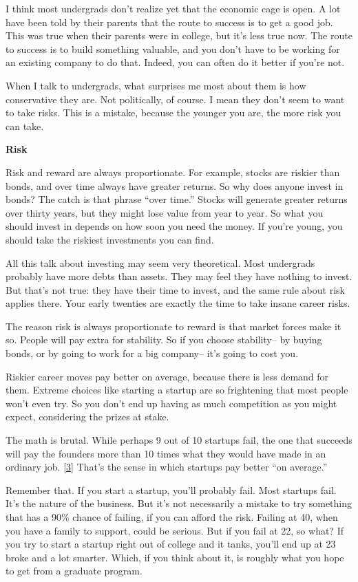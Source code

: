 I think most undergrads don't realize yet that the economic cage is
open. A lot have been told by their parents that the route to success is
to get a good job. This was true when their parents were in college, but
it's less true now. The route to success is to build something valuable,
and you don't have to be working for an existing company to do that.
Indeed, you can often do it better if you're not.

When I talk to undergrads, what surprises me most about them is how
conservative they are. Not politically, of course. I mean they don't
seem to want to take risks. This is a mistake, because the younger you
are, the more risk you can take.

\textbf{Risk}

Risk and reward are always proportionate. For example, stocks are
riskier than bonds, and over time always have greater returns. So why
does anyone invest in bonds? The catch is that phrase ``over time.''
Stocks will generate greater returns over thirty years, but they might
lose value from year to year. So what you should invest in depends on
how soon you need the money. If you're young, you should take the
riskiest investments you can find.

All this talk about investing may seem very theoretical. Most undergrads
probably have more debts than assets. They may feel they have nothing to
invest. But that's not true: they have their time to invest, and the
same rule about risk applies there. Your early twenties are exactly the
time to take insane career risks.

The reason risk is always proportionate to reward is that market forces
make it so. People will pay extra for stability. So if you choose
stability-- by buying bonds, or by going to work for a big company--
it's going to cost you.

Riskier career moves pay better on average, because there is less demand
for them. Extreme choices like starting a startup are so frightening
that most people won't even try. So you don't end up having as much
competition as you might expect, considering the prizes at stake.

The math is brutal. While perhaps 9 out of 10 startups fail, the one
that succeeds will pay the founders more than 10 times what they would
have made in an ordinary job. {[}\hyperref[f3n]{3}{]} That's the sense
in which startups pay better ``on average.''

Remember that. If you start a startup, you'll probably fail. Most
startups fail. It's the nature of the business. But it's not necessarily
a mistake to try something that has a 90\% chance of failing, if you can
afford the risk. Failing at 40, when you have a family to support, could
be serious. But if you fail at 22, so what? If you try to start a
startup right out of college and it tanks, you'll end up at 23 broke and
a lot smarter. Which, if you think about it, is roughly what you hope to
get from a graduate program.

